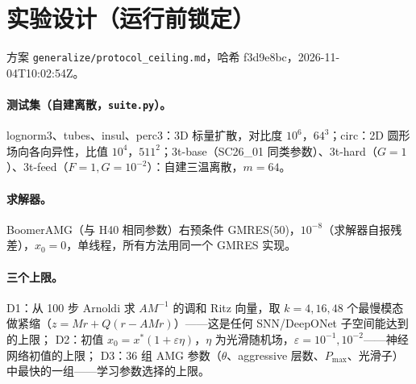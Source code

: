 \documentclass[11pt,a4paper]{ctexart}
\begin{document}
\section{实验设计（运行前锁定）}
方案 \texttt{generalize/protocol\_ceiling.md}，哈希 f3d9e8bc，2026-11-04T10:02:54Z。
\paragraph{测试集（自建离散，\texttt{suite.py}）。}
lognorm3、tubes、insul、perc3：3D 标量扩散，对比度 $10^6$，$64^3$；circ：2D 圆形场向各向异性，比值 $10^4$，$511^2$；3t-base（SC26\_01 同类参数）、3t-hard（$G=1$）、3t-feed（$F=1,G=10^{-2}$）：自建三温离散，$m=64$。
\paragraph{求解器。}BoomerAMG（与 H40 相同参数）右预条件 GMRES(50)，$10^{-8}$（求解器自报残差），$x_0=0$，单线程，所有方法用同一个 GMRES 实现。
\paragraph{三个上限。}
D1：从 100 步 Arnoldi 求 $AM^{-1}$ 的调和 Ritz 向量，取 $k=4,16,48$ 个最慢模态做紧缩（$z=Mr+Q(r-AMr)$）——这是任何 SNN/DeepONet 子空间能达到的上限；
D2：初值 $x_0=x^*(1+\varepsilon\eta)$，$\eta$ 为光滑随机场，$\varepsilon=10^{-1},10^{-2}$——神经网络初值的上限；
D3：36 组 AMG 参数（$\theta$、aggressive 层数、$P_{\max}$、光滑子）中最快的一组——学习参数选择的上限。
\end{document}

